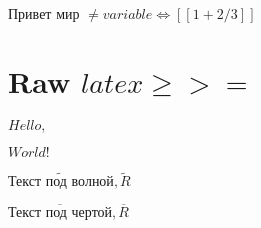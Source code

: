 
\(\text{Привет }\allowbreak\text{мир }\allowbreak\neq variable \Leftrightarrow [[1 + 2 / 3]]\)

\section{Raw $latex \ge >=$}


\(Hello, \)\( World!\)

\(\widetilde {\text{Текст }\allowbreak\text{под }\allowbreak\text{волной}\allowbreak}, \widetilde R\)

\(\overline {\text{Текст }\allowbreak\text{под }\allowbreak\text{чертой}\allowbreak}, \overline R\)
